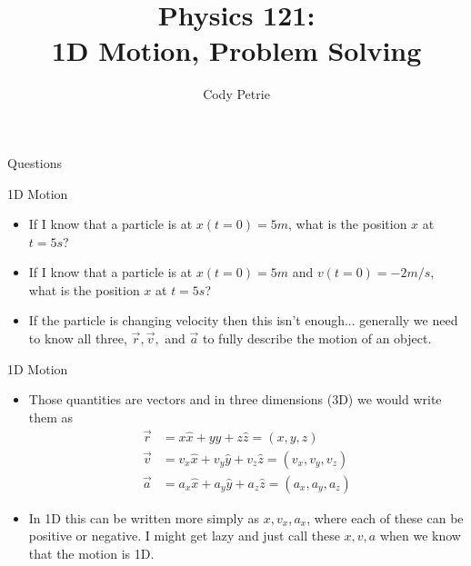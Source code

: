 \documentclass{beamer}
\title[{\color{white}{Chapters 1.6-7,2.1}}]{Physics 121: \\ 1D Motion, Problem Solving}
\author{Cody Petrie}
\institute{Mesa Community College}
\date{}
\begin{document}
\begin{frame}
\titlepage
\end{frame}



\begin{frame}{Questions}
\begin{center}
   \color{blue}{\Huge Any questions from the HW?}
\end{center}
\end{frame}

\begin{frame}{1D Motion}
\begin{itemize}
\item<1-> If I know that a particle is at $x(t=0)=5m$, what is the position $x$ at $t=5s$?
\item<2-> If I know that a particle is at $x(t=0)=5m$ and $v(t=0)=-2m/s$, what is the position $x$ at $t=5s$?
\item<3-> If the particle is changing velocity then this isn't enough... generally we need to know all three, $\vec{r}, \vec{v},$ and $\vec{a}$ to fully describe the motion of an object.
\end{itemize}
\end{frame}

\begin{frame}{1D Motion}
\begin{itemize}
   \item<1-> Those quantities are vectors and in three dimensions (3D) we would write them as
   \begin{align*}
      \vec{r}&=x\hat{x}+y\hat{y}+z\hat{z} = (x,y,z) \\
      \vec{v}&=v_x\hat{x}+v_y\hat{y}+v_z\hat{z} = (v_x,v_y,v_z) \\
      \vec{a}&=a_x\hat{x}+a_y\hat{y}+a_z\hat{z} = (a_x,a_y,a_z)
   \end{align*}
   \item <2-> In 1D this can be written more simply as $x, v_x, a_x$, where each of these can be positive or negative. I might get lazy and just call these $x, v, a$ when we know that the motion is 1D.
\end{itemize}
\end{frame}
\end{document}

